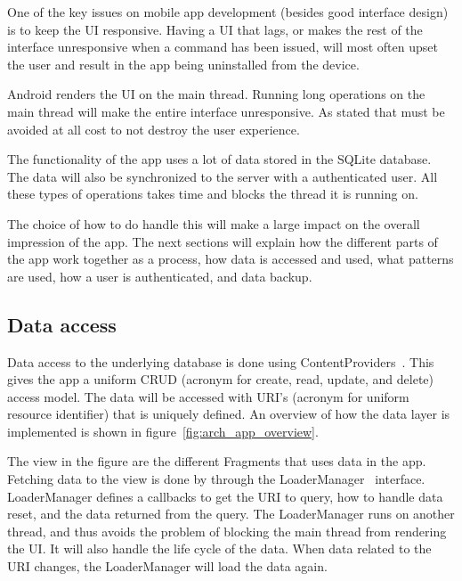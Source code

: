 One of the key issues on mobile app development (besides good interface design) is to keep the \gls{UI} responsive. Having a UI that lags, or makes the rest of the interface unresponsive when a command has been issued, will most often upset the user and result in the app being uninstalled from the device.

Android renders the UI on the main thread. Running long operations on the main thread will make the entire interface unresponsive. As stated that must be avoided at all cost to not destroy the user experience. 

The functionality of the app uses a lot of data stored in the SQLite database. The data will also be synchronized to the server with a authenticated user. All these types of operations takes time and blocks the thread it is running on.

The choice of how to do handle this will make a large impact on the overall impression of the app. The next sections will explain how the different parts of the app work together as a process, how data is accessed and used, what patterns are used, how a user is authenticated, and data backup.


\subsection{Data access}
Data access to the underlying database is done using ContentProviders~\cite{contentproviders}. This gives the app a uniform \gls{CRUD} (acronym for create, read, update, and delete) access model. The data will be accessed with \gls{URI}'s (acronym for uniform resource identifier) that is uniquely defined. An overview of how the data layer is implemented is shown in figure~\ref{fig:arch_app_overview}.

The view in the figure are the different Fragments that uses data in the app. Fetching data to the view is done by through the LoaderManager~\cite{loadermanager} interface. LoaderManager  defines a callbacks to get the URI to query, how to handle data reset, and the data returned from the query. The LoaderManager runs on another thread, and thus avoids the problem of blocking the main thread from rendering the UI. It will also handle the life cycle of the data. When data related to the URI changes, the LoaderManager will load the data again. 

